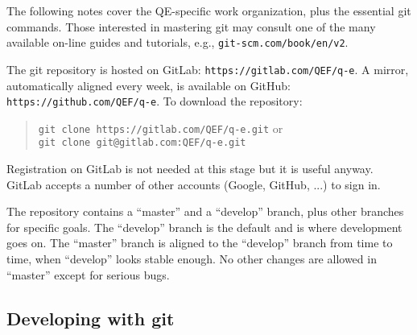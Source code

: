 \documentclass[12pt,a4paper]{article}
\def\qe{QE}
\begin{document}
The following notes cover the \qe-specific work organization, plus the
essential git commands. Those interested in mastering git may consult 
one of the many available on-line guides and tutorials, e.g.,
\verb|git-scm.com/book/en/v2|.

The git repository is hosted on GitLab: \verb|https://gitlab.com/QEF/q-e|.
A mirror, automatically aligned every week, is available
on GitHub: \verb|https://github.com/QEF/q-e|. To download the repository:
\begin{quote}
   \verb|git clone https://gitlab.com/QEF/q-e.git|  or\\
   \verb|git clone git@gitlab.com:QEF/q-e.git|
\end{quote}
Registration on GitLab is not needed at this stage but it is useful anyway. 
GitLab accepts a number of other accounts (Google, GitHub, ...) to sign in.

The repository contains a ``master'' and a ``develop'' branch,
plus other branches for specific goals. The ``develop'' branch is the
default and is where development goes on. The ``master'' branch is 
aligned to the ``develop'' branch from time to time, when ``develop'' 
looks stable enough. No other changes are allowed in ``master'' except 
for serious bugs.

\subsection{Developing with git}
\end{document}
